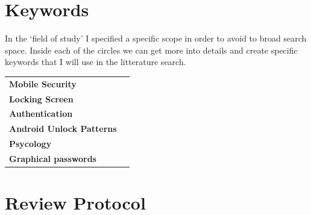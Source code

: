     \section*{Keywords}  

      In the `field of study' I specified a specific scope in order to avoid to broad search space. 
      Inside each of the circles we can get more into details and create specific keywords that I will use in 
      the litterature search. 

      
        \begin{tabular}{ || l | l ||}
          \hline
          {\bf Mobile Security} & \\
          {\bf Locking Screen} &  \\
          {\bf Authentication} &  \\
          {\bf Android Unlock Patterns} & \\ 
          {\bf Psycology} & \\
          {\bf Graphical passwords} & \\
          \hline

          
        \end{tabular}




    \section*{Review Protocol}


